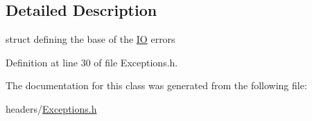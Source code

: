 \subsection{Detailed Description}
struct defining the base of the \hyperlink{classIO}{I\+O} errors 

Definition at line 30 of file Exceptions.\+h.



The documentation for this class was generated from the following file\+:\begin{DoxyCompactItemize}
\item 
headers/\hyperlink{Exceptions_8h}{Exceptions.\+h}\end{DoxyCompactItemize}
